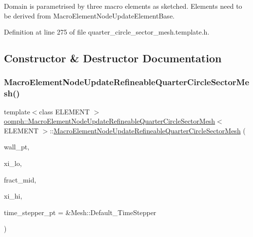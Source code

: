 Domain is parametrised by three macro elements as sketched. Elements need to be derived from Macro\+Element\+Node\+Update\+Element\+Base. 

Definition at line 275 of file quarter\+\_\+circle\+\_\+sector\+\_\+mesh.\+template.\+h.



\subsection{Constructor \& Destructor Documentation}
\mbox{\label{classoomph_1_1MacroElementNodeUpdateRefineableQuarterCircleSectorMesh_ace75c8edb3d87019dc7f06152205adab}} 
\subsubsection{\texorpdfstring{Macro\+Element\+Node\+Update\+Refineable\+Quarter\+Circle\+Sector\+Mesh()}{MacroElementNodeUpdateRefineableQuarterCircleSectorMesh()}}
{\footnotesize\ttfamily template$<$class E\+L\+E\+M\+E\+NT $>$ \\
\hyperlink{classoomph_1_1MacroElementNodeUpdateRefineableQuarterCircleSectorMesh}{oomph\+::\+Macro\+Element\+Node\+Update\+Refineable\+Quarter\+Circle\+Sector\+Mesh}$<$ E\+L\+E\+M\+E\+NT $>$\+::\hyperlink{classoomph_1_1MacroElementNodeUpdateRefineableQuarterCircleSectorMesh}{Macro\+Element\+Node\+Update\+Refineable\+Quarter\+Circle\+Sector\+Mesh} (\begin{DoxyParamCaption}\item[{Geom\+Object $\ast$}]{wall\+\_\+pt,  }\item[{const double \&}]{xi\+\_\+lo,  }\item[{const double \&}]{fract\+\_\+mid,  }\item[{const double \&}]{xi\+\_\+hi,  }\item[{Time\+Stepper $\ast$}]{time\+\_\+stepper\+\_\+pt = {\ttfamily \&Mesh\+:\+:Default\+\_\+TimeStepper} }\end{DoxyParamCaption})\hspace{0.3cm}{\ttfamily [inline]}}



